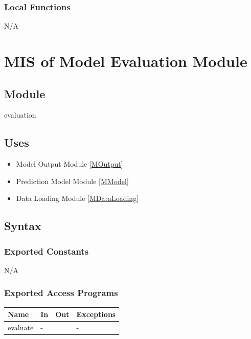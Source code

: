 \documentclass[12pt, titlepage]{article}
\begin{document}
\subsubsection{Local Functions}

N/A

\newpage
\section{MIS of Model Evaluation Module} \label{mAccuracy}

\subsection{Module}

evaluation

\subsection{Uses}

\begin{itemize}
  \item Model Output Module \ref{MOutput}
  \item Prediction Model Module \ref{MModel}
  \item Data Loading Module \ref{MDataLoading}
\end{itemize}

\subsection{Syntax}

\subsubsection{Exported Constants}

N/A

\subsubsection{Exported Access Programs}

\begin{center}
\begin{tabular}{p{4cm} p{4cm} p{4cm} p{2cm}}
\hline
\textbf{Name} & \textbf{In} & \textbf{Out} & \textbf{Exceptions} \\
\hline
evaluate & -  &  & - \\
\hline
\end{tabular}
\end{center}
\end{document}
